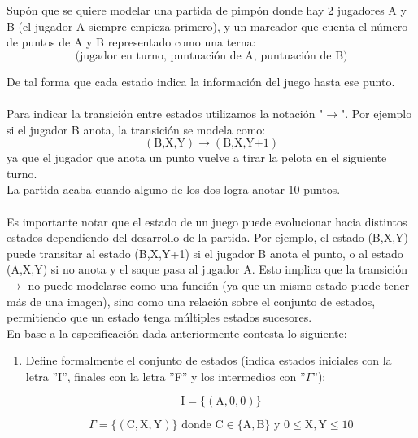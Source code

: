     \begin{exercise}
   
        Supón que se quiere modelar una partida de pimpón donde hay 2 jugadores A y B (el jugador A siempre empieza primero), y un marcador que cuenta el número de puntos de A y B representado como una terna: \[ \text{(jugador en turno, puntuación de A, puntuación de B)} \] 
  
        De tal forma que cada estado indica la información del juego hasta ese punto. \\\\
        Para indicar la transición entre estados utilizamos la notación "$\rightarrow$". Por ejemplo si el jugador B anota, la transición se modela como: \[ (\text{B,X,Y}) \rightarrow (\text{B,X,Y+1}) \]  ya que el jugador que anota un punto vuelve a tirar la pelota en el siguiente turno.\\
        La partida acaba cuando alguno de los dos logra anotar 10 puntos. \\\\
        Es importante notar que el estado de un juego puede evolucionar hacia distintos estados dependiendo del desarrollo de la partida. Por ejemplo, el estado (B,X,Y) puede transitar al estado (B,X,Y+1) si el jugador B anota el punto, o al estado (A,X,Y) si no anota y el saque pasa al jugador A. Esto implica que la transición $\rightarrow$ no puede modelarse como una función (ya que un mismo estado puede tener más de una imagen), sino como una relación sobre el conjunto de estados, permitiendo que un estado tenga múltiples estados sucesores.\\ 

        En base a la especificación dada anteriormente contesta lo siguiente:
        \begin{enumerate}
            \item Define formalmente el conjunto de estados (indica estados iniciales con la letra  ''I'', finales con la letra  ''F'' y los intermedios con ''$\Gamma$''): 

                \begin{equation}
                    \text{I} = \{(\text{A},0,0)\}\nonumber
                 \end{equation}    

                 \begin{equation}
                    \Gamma = \{(\text{C},\text{X},\text{Y})\} \text{ donde } \text{C} \in \{\text{A},\text{B}\} \text{ y } 0 \leq \text{X},\text{Y} \leq 10\nonumber
                 \end{equation}


\end{enumerate}
\end{exercise}

